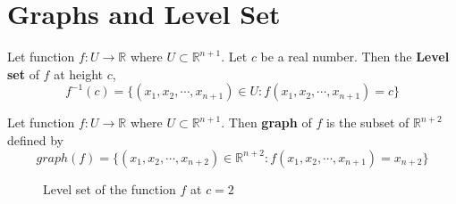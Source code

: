 

\section{Graphs and Level Set}
\begin{definition}
	Let function $f : U \to \mathbb{R}$ where $U \subset \mathbb{R}^{n+1}$.
	Let $c$ be a real number.
	Then the \textbf{Level set} of $f$ at height $c$,
	\begin{equation}
		f^{-1}(c) = \{ (x_1,x_2,\cdots,x_{n+1}) \in U : f(x_1,x_2,\cdots,x_{n+1}) = c \}
	\end{equation} 
\end{definition}

\begin{definition}
	Let function $f : U \to \mathbb{R}$ where $U \subset \mathbb{R}^{n+1}$.
	Then \textbf{graph} of $f$ is the subset of $\mathbb{R}^{n+2}$ defined by
\begin{equation}
	graph(f) = \{ (x_1,x_2,\cdots,x_{n+2}) \in \mathbb{R}^{n+2} : f(x_1,x_2,\cdots,x_{n+1}) = x_{n+2} \}
\end{equation}
\end{definition}

\begin{figure}[h]
	\centering
	\caption{Level set of the function $f$ at $c = 2$}
\end{figure}

